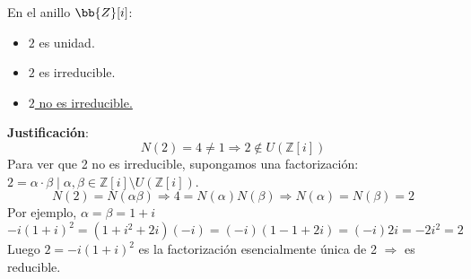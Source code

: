 \begin{ejercicio}
    En el anillo $\bb{Z}[i]$:
    \begin{itemize}
        \item $2$ es unidad.
        \item $2$ es irreducible.
        \item \underline{$2$ no es irreducible.}
    \end{itemize}

    \noindent
    \textbf{Justificación}:
    \begin{equation*}
        N(2) = 4 \neq 1 \Longrightarrow 2 \notin U(\mathbb{Z}[i])
    \end{equation*}
    Para ver que 2 no es irreducible, supongamos una factorización: $2=\alpha \cdot \beta \mid \alpha, \beta \in \mathbb{Z}[i]\setminus U(\mathbb{Z}[i])$.
    \begin{equation*}
        N(2) = N(\alpha \beta) \Longrightarrow 4=N(\alpha)N(\beta) \Longrightarrow N(\alpha) = N(\beta) = 2
    \end{equation*}
    Por ejemplo, $\alpha = \beta = 1+i$
    \begin{equation*}
        -i{(1+i)}^{2} = (1+i^2 + 2i)(-i) = (-i)(1-1+2i) = (-i)2i = -2i^2 = 2
    \end{equation*}
    Luego $2 = -i{(1+i)}^{2}$ es la factorización esencialmente única de 2 $\Longrightarrow$ es reducible.
\end{ejercicio}
\newpage
\resetearcontador
